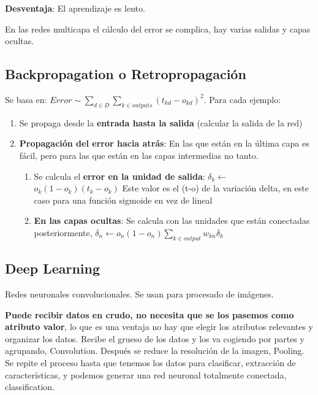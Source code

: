 \documentclass[12pt, twoside, openright]{report} %
\begin{document}
\textbf{Desventaja}: El aprendizaje es lento.

En las redes multicapa el cálculo del error se complica, hay varias
salidas y capas ocultas.

\subsection{Backpropagation o Retropropagación}

Se basa en:
$Error \sim \sum _{d \in D} \sum_{k \in outputs} (t_{kd}-o_{kd})^2$.
Para cada ejemplo:

\begin{enumerate}
	\def\labelenumi{\arabic{enumi}.}
	\item Se propaga desde la \textbf{entrada hasta la salida} (calcular la salida de la red)
	\item \textbf{Propagación del error hacia atrás}: En las que están en la
	      última capa es fácil, pero para las que están en las capas intermedias
	      no tanto.

	      \begin{enumerate}
		      \def\labelenumii{\arabic{enumii}.}
		      \item Se calcula el \textbf{error en la unidad de salida}:
		            \(\delta_k \leftarrow\) \(o_k(1-o_k)(t_k-o_k)\) Este valor es el
		            (t-o) de la variación delta, en este caso para una función sigmoide
		            en vez de lineal
		      \item \textbf{En las capas ocultas}: Se calcula con las unidades que están
		            conectadas posteriormente,
		            \(\delta_n \leftarrow o_n(1-o_n)\sum_{k \in output} w_{kn}\delta_k\)
	      \end{enumerate}
\end{enumerate}

\subsection{Deep Learning}

Redes neuronales convolucionales. Se usan para procesado de imágenes.

\textbf{Puede recibir datos en crudo, no necesita que se los pasemos
	como atributo valor}, lo que es una ventaja no hay que elegir los atributos
relevantes y organizar los datos. Recibe el grueso de los datos y los
va cogiendo por partes y agrupando, Convolution. Después se reduce la
resolución de la imagen, Pooling. Se repite el proceso hasta que tenemos
los datos para clasificar, extracción de características, y podemos
generar una red neuronal totalmente conectada, classification.
\end{document}
